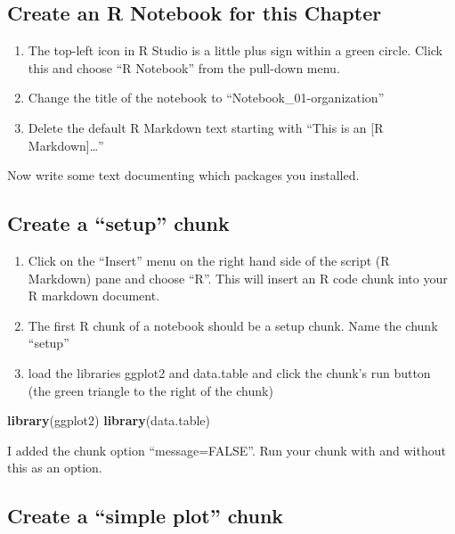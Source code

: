 \documentclass[]{book}
\newenvironment{Shaded}{\begin{snugshade}}{\end{snugshade}}
\newcommand{\KeywordTok}[1]{\textcolor[rgb]{0.13,0.29,0.53}{\textbf{#1}}}
\newcommand{\NormalTok}[1]{#1}
\providecommand{\tightlist}{%
  \setlength{\itemsep}{0pt}\setlength{\parskip}{0pt}}
\theoremstyle{definition}
\theoremstyle{definition}
\theoremstyle{definition}
\theoremstyle{remark}
\begin{document}
\subsection{Create an R Notebook for this
Chapter}\label{create-an-r-notebook-for-this-chapter}

\begin{enumerate}
\def\labelenumi{\arabic{enumi}.}
\tightlist
\item
  The top-left icon in R Studio is a little plus sign within a green
  circle. Click this and choose ``R Notebook'' from the pull-down menu.
\item
  Change the title of the notebook to ``Notebook\_01-organization''
\item
  Delete the default R Markdown text starting with ``This is an {[}R
  Markdown{]}\ldots{}''
\end{enumerate}

Now write some text documenting which packages you installed.

\subsection{\texorpdfstring{Create a ``setup''
chunk}{Create a setup chunk}}\label{create-a-setup-chunk}

\begin{enumerate}
\def\labelenumi{\arabic{enumi}.}
\tightlist
\item
  Click on the ``Insert'' menu on the right hand side of the script (R
  Markdown) pane and choose ``R''. This will insert an R code chunk into
  your R markdown document.
\item
  The first R chunk of a notebook should be a setup chunk. Name the
  chunk ``setup''
\item
  load the libraries ggplot2 and data.table and click the chunk's run
  button (the green triangle to the right of the chunk)
\end{enumerate}

\begin{Shaded}
\begin{Highlighting}[]
\KeywordTok{library}\NormalTok{(ggplot2)}
\KeywordTok{library}\NormalTok{(data.table)}
\end{Highlighting}
\end{Shaded}

I added the chunk option ``message=FALSE''. Run your chunk with and
without this as an option.

\subsection{\texorpdfstring{Create a ``simple plot''
chunk}{Create a simple plot chunk}}\label{create-a-simple-plot-chunk}
\end{document}
